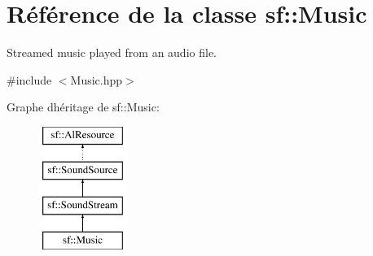 \hypertarget{classsf_1_1Music}{}\section{Référence de la classe sf\+:\+:Music}
\label{classsf_1_1Music}


Streamed music played from an audio file.  




{\ttfamily \#include $<$Music.\+hpp$>$}

Graphe d\textquotesingle{}héritage de sf\+:\+:Music\+:\begin{figure}[H]
\begin{center}
\leavevmode
\includegraphics[height=4.000000cm]{classsf_1_1Music}
\end{center}
\end{figure}
